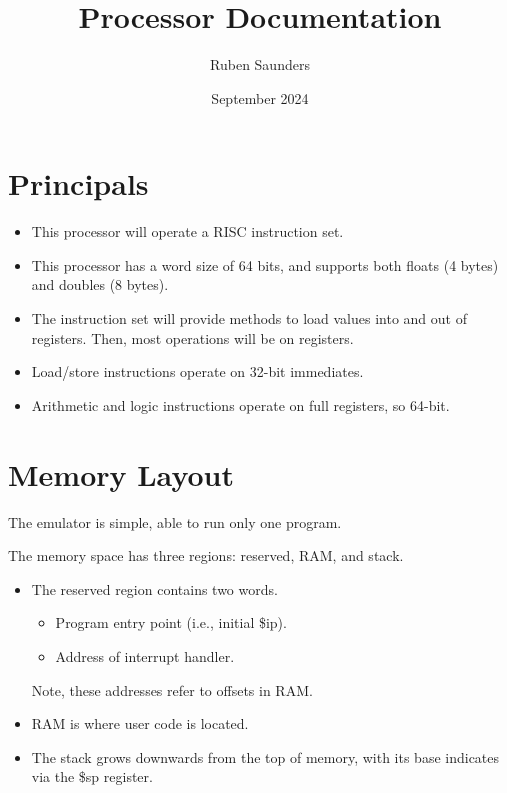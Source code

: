 \documentclass[10pt]{article}
\title{Processor Documentation}
\author{Ruben Saunders}
\date{September 2024}
\begin{document}
    \maketitle
    \tableofcontents

    \newpage

    \section{Principals}\label{sec:principals}

    \begin{itemize}
        \item This processor will operate a RISC instruction set.
        \item This processor has a word size of 64 bits, and supports both floats (4 bytes) and doubles (8 bytes).
        \item The instruction set will provide methods to load values into and out of registers.
        Then, most operations will be on registers.
        \item Load/store instructions operate on 32-bit immediates.
        \item Arithmetic and logic instructions operate on full registers, so 64-bit.
    \end{itemize}

    \section{Memory Layout}\label{sec:memory-layout}

    The emulator is simple, able to run only one program.

    The memory space has three regions: reserved, RAM, and stack.
    \begin{itemize}
        \item The reserved region contains two words.
        \begin{itemize}
            \item Program entry point (i.e., initial \$ip).
            \item Address of interrupt handler.
        \end{itemize}
        Note, these addresses refer to offsets in RAM.
        \item RAM is where user code is located.
        \item The stack grows downwards from the top of memory, with its base indicates via the \$sp register.
    \end{itemize}
\end{document}
